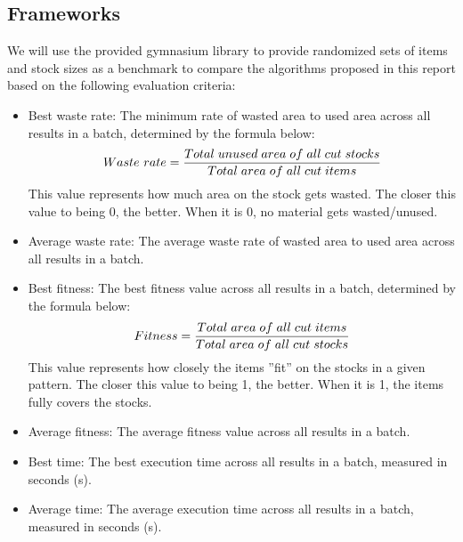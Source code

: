 \documentclass[a4paper]{article}
\begin{document}
    \subsection{Frameworks}
    We will use the provided gymnasium library to provide randomized sets of items and stock sizes as a benchmark to compare the algorithms proposed in this report based on the following evaluation criteria:
    \begin{itemize}
        \item Best waste rate: The minimum rate of wasted area to used area across all results in a batch, determined by the formula below:
        \[Waste\ rate = \frac{Total \hspace{0.1cm} unused \hspace{0.1cm} area \hspace{0.1cm} of \hspace{0.1cm} all \hspace{0.1cm} cut \hspace{0.1cm} stocks}{Total \hspace{0.1cm} area \hspace{0.1cm} of \hspace{0.1cm} all \hspace{0.1cm} cut \hspace{0.1cm} items}\]
        This value represents how much area on the stock gets wasted.
        The closer this value to being 0, the better. When it is 0, no material gets wasted/unused.
        \item Average waste rate: The average waste rate of wasted area to used area across all results in a batch.
        \item Best fitness: The best fitness value across all results in a batch, determined by the formula below:
        \[Fitness = \frac{Total \hspace{0.1cm} area \hspace{0.1cm} of \hspace{0.1cm} all \hspace{0.1cm} cut \hspace{0.1cm} items}{Total \hspace{0.1cm} area \hspace{0.1cm} of \hspace{0.1cm} all \hspace{0.1cm} cut \hspace{0.1cm} stocks}\]
        This value represents how closely the items ''fit'' on the stocks in a given pattern.
        The closer this value to being 1, the better. When it is 1, the items fully covers the stocks.
        \item Average fitness: The average fitness value across all results in a batch.
        \item Best time: The best execution time across all results in a batch, measured in seconds (s).
        \item Average time: The average execution time across all results in a batch, measured in seconds (s).
    \end{itemize}
\end{document}

